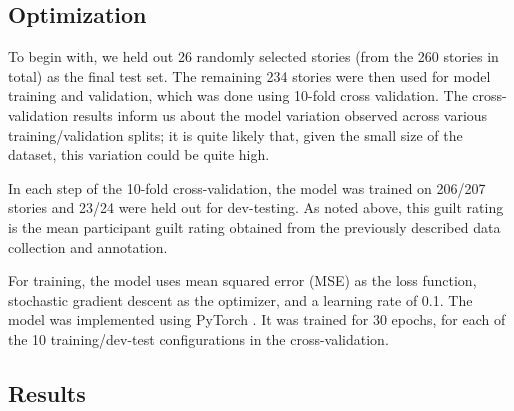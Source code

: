 \documentclass[11pt,a4paper]{article}
\begin{document}
\subsection{Optimization}

To begin with, we held out 26 randomly selected stories (from the 260 stories in total) as the final test set. The remaining 234 stories were then used for model training and validation, which was done using 10-fold cross validation. The cross-validation results inform us about the model variation observed across  various training/validation splits; it is quite likely that, given the small size of the dataset, this variation could be quite high.

In each step of the 10-fold cross-validation, the model was trained on 206/207 stories and 23/24 were held out for dev-testing. As noted above, this guilt rating is the mean participant guilt rating obtained from the previously described data collection and annotation.

For training, the model uses mean squared error (MSE) as the loss function, stochastic gradient descent as the optimizer, and a learning rate of 0.1. The model was implemented using PyTorch \citep{Paszke:2017}. It was trained for 30 epochs, for each of the 10 training/dev-test configurations in the cross-validation.




\subsection{Results}
\end{document}
